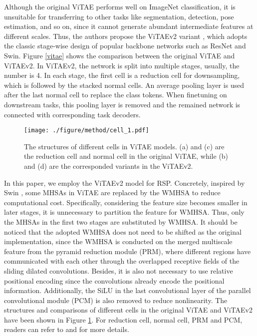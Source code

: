 \documentclass[10pt, journal,twoside]{IEEEtran}
\begin{document}
Although the original ViTAE performs well on ImageNet classification, it is unsuitable for transferring to other tasks like segmentation, detection, pose estimation, and so on, since it cannot generate abundant intermediate features at different scales. Thus, the authors propose the ViTAEv2 variant \cite{vitae_v2}, which adopts the classic stage-wise design of popular backbone networks such as ResNet and Swin. Figure \ref{vitae} shows the comparison between the original ViTAE and ViTAEv2. In ViTAEv2, the network is split into multiple stages, usually, the number is 4. In each stage, the first cell is a reduction cell for downsampling, which is followed by the stacked normal cells. An average pooling layer is used after the last normal cell to replace the class tokens. When finetuning on downstream tasks, this pooling layer is removed and the remained network is connected with corresponding task decoders.


\begin{figure}[t]
  \centering
  \texttt{[image: ./figure/method/cell\_1.pdf]}\\
  \caption{The structures of different cells in ViTAE models. (a) and (c) are the reduction cell and normal cell in the original ViTAE, while (b) and (d) are the corresponded variants in the ViTAEv2.
  }
  \label{cell}
\end{figure}

In this paper, we employ the ViTAEv2 model for RSP. Concretely, inspired by Swin \cite{swint}, some MHSAs in ViTAE are replaced by the WMHSA to reduce computational cost. Specifically, considering the feature size becomes smaller in later stages, it is unnecessary to partition the feature for WMHSA. Thus, only the MHSAs in the first two stages are substituted by WMHSA. It should be noticed that the adopted WMHSA does not need to be shifted as the original implementation, since the WMHSA is conducted on the merged multiscale feature from the pyramid reduction module (PRM), where different regions have communicated with each other through the overlapped receptive fields of the sliding dilated convolutions. Besides, it is also not necessary to use relative positional encoding since the convolutions already encode the positional information. Additionally, the SiLU \cite{silu} in the last convolutional layer of the parallel convolutional module (PCM) is also removed to reduce nonlinearity. The structures and comparisons of different cells in the original ViTAE and ViTAEv2 have been shown in Figure \ref{cell}. For reduction cell, normal cell, PRM and PCM, readers can refer to \cite{xu2021vitae} and \cite{vitae_v2} for more details.
\end{document}
